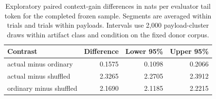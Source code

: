 \begin{table}[H]\centering\small
\begin{tabular}{lrrr}\toprule
Contrast & Difference & Lower 95\% & Upper 95\% \\ \midrule
actual minus ordinary & 0.1575 & 0.1098 & 0.2066 \\
actual minus shuffled & 2.3265 & 2.2705 & 2.3912 \\
ordinary minus shuffled & 2.1690 & 2.1185 & 2.2215 \\
\bottomrule\end{tabular}
\caption{Exploratory paired context-gain differences in nats per evaluator tail token for the completed frozen sample. Segments are averaged within trials and trials within payloads. Intervals use 2,000 payload-cluster draws within artifact class and condition on the fixed donor corpus.}\label{tab:v4-coherence}
\end{table}
